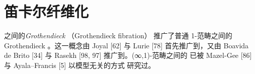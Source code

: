 \providecommand{\qcor}[1]{\ulcorner#1\urcorner}   %
\providecommand{\qcTwo}{\mathbf{2}}   %
\providecommand{\qcThree}{\mathbf{3}} %
\providecommand{\cellpair}[5]{$\vcenter{\hbox{\begin{tikzpicture}[x=1.15em,y=1.15em]%
\node (s) at (0,0) {$#1$};%
\node (t) at (4.2,0) {$#2$};%
\draw[->] (0.75,0.32) to[bend left=18] (3.45,0.32);%
\node at (2.1,0.88) {$\scriptstyle#3$};%
\draw[->] (0.75,-0.32) to[bend right=18] (3.45,-0.32);%
\node at (2.1,-0.93) {$\scriptstyle#4$};%
\draw[->] (1.95,0.2) to[bend right=32] (1.95,-0.2);%
\node at (2.85,0) {$\scriptstyle#5$};%
\end{tikzpicture}}}$\ignorespaces}

\section{笛卡尔纤维化}\label{sec:cartesian-fibrations}

\trInfinityCategory{}之间的\emph{Grothendieck \trFibration}（Grothendieck fibration）
推广了普通 1-范畴之间的 Grothendieck \trFibration。这一概念由%
Joyal [62] 与 Lurie [78] 首先推广到\trQuasiCategory，又由 Boavida de Brito [34]
与 Rasekh [98, 97] 推广到\trCompleteSegalSpaces。(∞,1)-范畴之间的%
\trCartesianFibration{}已被 Mazel-Gee [86] 与 Ayala–Francis [5] 以模型无关的方式
研究过。

